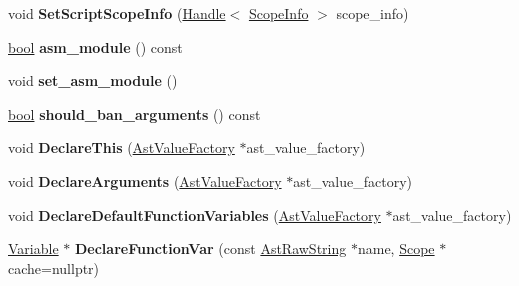 \begin{DoxyCompactItemize}
void {\bfseries Set\+Script\+Scope\+Info} (\mbox{\hyperlink{classv8_1_1internal_1_1Handle}{Handle}}$<$ \mbox{\hyperlink{classv8_1_1internal_1_1ScopeInfo}{Scope\+Info}} $>$ scope\+\_\+info)
\item 
\mbox{\label{classv8_1_1internal_1_1DeclarationScope_a96c302a0df5f661b923bb211bc0df35c}} 
\mbox{\hyperlink{classbool}{bool}} {\bfseries asm\+\_\+module} () const
\item 
\mbox{\label{classv8_1_1internal_1_1DeclarationScope_a555ef97d772118d0b97be53ad570f133}} 
void {\bfseries set\+\_\+asm\+\_\+module} ()
\item 
\mbox{\label{classv8_1_1internal_1_1DeclarationScope_a20fa0e6d47c54186608a7e344e0dc67d}} 
\mbox{\hyperlink{classbool}{bool}} {\bfseries should\+\_\+ban\+\_\+arguments} () const
\item 
\mbox{\label{classv8_1_1internal_1_1DeclarationScope_a9bda01b7cdf0136438bbe3c9e8ac8eac}} 
void {\bfseries Declare\+This} (\mbox{\hyperlink{classv8_1_1internal_1_1AstValueFactory}{Ast\+Value\+Factory}} $\ast$ast\+\_\+value\+\_\+factory)
\item 
\mbox{\label{classv8_1_1internal_1_1DeclarationScope_ae2896afd67fbcafb9559bc09b37410d1}} 
void {\bfseries Declare\+Arguments} (\mbox{\hyperlink{classv8_1_1internal_1_1AstValueFactory}{Ast\+Value\+Factory}} $\ast$ast\+\_\+value\+\_\+factory)
\item 
\mbox{\label{classv8_1_1internal_1_1DeclarationScope_af93b0d8cc5508b2825afa6f317b8f7bc}} 
void {\bfseries Declare\+Default\+Function\+Variables} (\mbox{\hyperlink{classv8_1_1internal_1_1AstValueFactory}{Ast\+Value\+Factory}} $\ast$ast\+\_\+value\+\_\+factory)
\item 
\mbox{\label{classv8_1_1internal_1_1DeclarationScope_aebff7e2dca5bc0fcddd25ceb5dfa01f6}} 
\mbox{\hyperlink{classv8_1_1internal_1_1Variable}{Variable}} $\ast$ {\bfseries Declare\+Function\+Var} (const \mbox{\hyperlink{classv8_1_1internal_1_1AstRawString}{Ast\+Raw\+String}} $\ast$name, \mbox{\hyperlink{classv8_1_1internal_1_1Scope}{Scope}} $\ast$cache=nullptr)

\end{DoxyCompactItemize}
